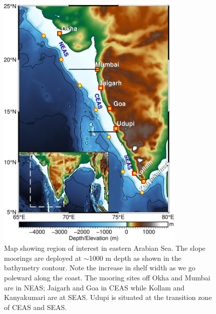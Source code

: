 \documentclass[authoryear,review,12pt]{elsarticle}
\begin{document}
\newpage
\begin{figure}[htbp]
	\centering
	\includegraphics[width=0.8\textwidth]{./figures/adcp_moorings_new1.jpg} 
	\captionsetup{justification=justified,font=footnotesize,skip=0.05\baselineskip,width=0.8\textwidth}
	\caption{Map showing region of interest in eastern Arabian Sea. The slope moorings are
		deployed at $\sim$1000 m depth as shown in the bathymetry contour. Note the increase in shelf width as we go poleward along the coast. The mooring sites off Okha and Mumbai are in NEAS; Jaigarh and Goa in CEAS while Kollam and Kanyakumari are at SEAS. Udupi is situated at the transition zone of CEAS and SEAS.}
	\label{fig:map}
\end{figure}
\end{document}
